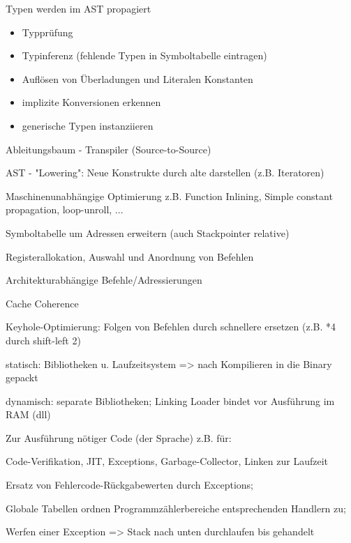 Typen werden im AST propagiert 
\begin{itemize}
\item Typprüfung
\item Typinferenz (fehlende Typen in Symboltabelle eintragen)
\item Auflösen von Überladungen und Literalen Konstanten
\item implizite Konversionen erkennen
\item generische Typen instanziieren
\end{itemize}



Ableitungsbaum - Transpiler (Source-to-Source)

AST - "Lowering": Neue Konstrukte durch alte darstellen (z.B. Iteratoren)

Maschinenunabhängige Optimierung z.B. Function Inlining, Simple constant propagation, loop-unroll, ...



Symboltabelle um Adressen erweitern (auch Stackpointer relative)

Registerallokation, Auswahl und Anordnung von Befehlen

Architekturabhängige Befehle/Adressierungen

Cache Coherence

Keyhole-Optimierung: Folgen von Befehlen durch schnellere ersetzen (z.B. *4 durch shift-left 2)

statisch: Bibliotheken u. Laufzeitsystem => nach Kompilieren in die Binary gepackt

dynamisch: separate Bibliotheken; Linking Loader bindet vor Ausführung im RAM (dll)

Zur Ausführung nötiger Code (der Sprache) z.B. für:

Code-Verifikation, JIT, Exceptions, Garbage-Collector, Linken zur Laufzeit

Ersatz von Fehlercode-Rückgabewerten durch Exceptions;

Globale Tabellen ordnen Programmzählerbereiche entsprechenden Handlern zu; 

 Werfen einer Exception => Stack nach unten durchlaufen bis gehandelt

